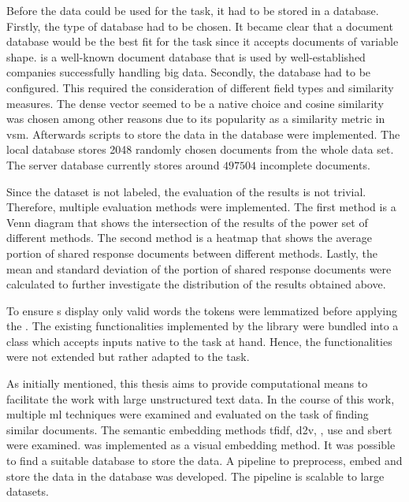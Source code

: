 Before the data could be used for the task, it had to be stored in a database.
Firstly, the type of database had to be chosen.
It became clear that a document database would be the best fit for the task 
since it accepts documents of variable shape.
\databaseName{} is a well-known document database that is used by 
well-established companies successfully handling big data.
Secondly, the database had to be configured.
This required the consideration of different field types and similarity measures.
The dense vector seemed to be a native choice and cosine similarity was chosen 
among other reasons due to its popularity as a similarity metric in \ac{vsm}.
Afterwards scripts to store the data in the database were implemented.
The local database stores 2048 randomly chosen documents from the whole data set.
The server database currently stores around $497504$ incomplete documents.

Since the dataset is not labeled, the evaluation of the results is not trivial.
Therefore, multiple evaluation methods were implemented.
The first method is a Venn diagram that shows the intersection of the results of the power set of different methods.
The second method is a heatmap that shows the average portion of shared response documents between different methods.
Lastly, the mean and standard deviation of the portion of shared response documents were calculated 
to further investigate the distribution of the results obtained above.

To ensure \wordcloud{}s display only valid words the tokens were lemmatized before applying the \wordcloud{}. 
The existing functionalities implemented by the library \topTwovec{} were bundled into a class 
which accepts inputs native to the task at hand.
Hence, the functionalities were not extended but rather adapted to the task.  


As initially mentioned, this thesis aims to provide computational means to facilitate the work with large unstructured text data.
In the course of this work, multiple \ac{ml} techniques were examined and evaluated on the task of finding similar documents.
The semantic embedding methods \ac{tfidf}, \ac{d2v}, \infersent{}, \ac{use} and \ac{sbert} were examined.
\eigendocs{} was implemented as a visual embedding method.
It was possible to find a suitable database to store the data.
A pipeline to preprocess, embed and store the data in the database was developed.
The pipeline is scalable to large datasets.

